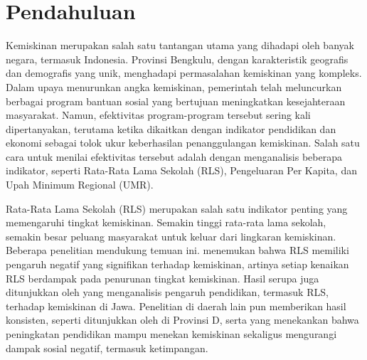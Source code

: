 \documentclass{article}
\begin{document}



\section{Pendahuluan}

Kemiskinan merupakan salah satu tantangan utama yang dihadapi oleh banyak negara, termasuk Indonesia. Provinsi Bengkulu, dengan karakteristik geografis dan demografis yang unik, menghadapi permasalahan kemiskinan yang kompleks. Dalam upaya menurunkan angka kemiskinan, pemerintah telah meluncurkan berbagai program bantuan sosial yang bertujuan meningkatkan kesejahteraan masyarakat. Namun, efektivitas program-program tersebut sering kali dipertanyakan, terutama ketika dikaitkan dengan indikator pendidikan dan ekonomi sebagai tolok ukur keberhasilan penanggulangan kemiskinan. Salah satu cara untuk menilai efektivitas tersebut adalah dengan menganalisis beberapa indikator, seperti Rata-Rata Lama Sekolah (RLS), Pengeluaran Per Kapita, dan Upah Minimum Regional (UMR).



Rata-Rata Lama Sekolah (RLS) merupakan salah satu indikator penting yang memengaruhi tingkat kemiskinan. Semakin tinggi rata-rata lama sekolah, semakin besar peluang masyarakat untuk keluar dari lingkaran kemiskinan. Beberapa penelitian mendukung temuan ini. \cite{pradipta2020pengaruh} menemukan bahwa RLS memiliki pengaruh negatif yang signifikan terhadap kemiskinan, artinya setiap kenaikan RLS berdampak pada penurunan tingkat kemiskinan. Hasil serupa juga ditunjukkan oleh \cite{permatasari2024analisis} yang menganalisis pengaruh pendidikan, termasuk RLS, terhadap kemiskinan di Jawa. Penelitian di daerah lain pun memberikan hasil konsisten, seperti ditunjukkan oleh \cite{samudra2023pengaruh} di Provinsi D, serta \cite{supriyadi2024ketimpangn} yang menekankan bahwa peningkatan pendidikan mampu menekan kemiskinan sekaligus mengurangi dampak sosial negatif, termasuk ketimpangan.
\end{document}
